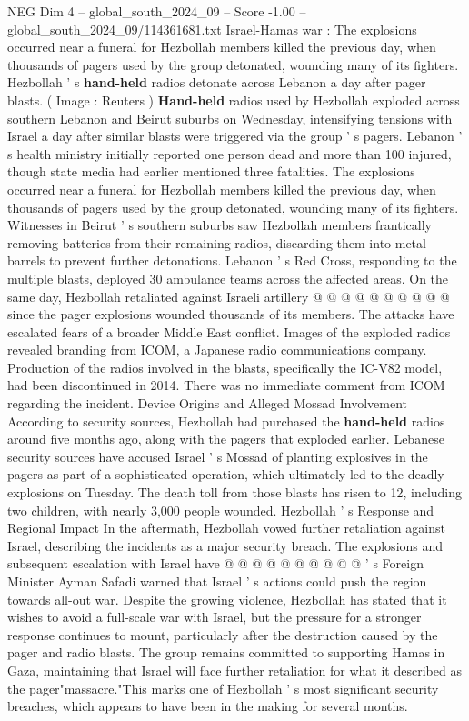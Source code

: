 \begin{textsample}{NEG Dim 4 – global\_south\_2024\_09 – Score -1.00 – global\_south\_2024\_09/114361681.txt}  \label{ex:f4_neg_183}
Israel-Hamas war : The explosions occurred near a funeral for Hezbollah members killed the previous day, when thousands of pagers used by the group detonated, wounding many of its fighters.
Hezbollah ' s \textbf{hand-held} radios detonate across Lebanon a day after pager blasts. ( Image : Reuters ) \textbf{Hand-held} radios used by Hezbollah exploded across southern Lebanon and Beirut suburbs on Wednesday, intensifying tensions with Israel a day after similar blasts were triggered via the group ' s pagers.
Lebanon ' s health ministry initially reported one person dead and more than 100 injured, though state media had earlier mentioned three fatalities.
The explosions occurred near a funeral for Hezbollah members killed the previous day, when thousands of pagers used by the group detonated, wounding many of its fighters.
Witnesses in Beirut ' s southern suburbs saw Hezbollah members frantically removing batteries from their remaining radios, discarding them into metal barrels to prevent further detonations.
Lebanon ' s Red Cross, responding to the multiple blasts, deployed 30 ambulance teams across the affected areas.
On the same day, Hezbollah retaliated against Israeli artillery @ @ @ @ @ @ @ @ @ @ since the pager explosions wounded thousands of its members.
The attacks have escalated fears of a broader Middle East conflict.
Images of the exploded radios revealed branding from ICOM, a Japanese radio communications company.
Production of the radios involved in the blasts, specifically the IC-V82 model, had been discontinued in 2014.
There was no immediate comment from ICOM regarding the incident.
Device Origins and Alleged Mossad Involvement According to security sources, Hezbollah had purchased the \textbf{hand-held} radios around five months ago, along with the pagers that exploded earlier.
Lebanese security sources have accused Israel ' s Mossad of planting explosives in the pagers as part of a sophisticated operation, which ultimately led to the deadly explosions on Tuesday.
The death toll from those blasts has risen to 12, including two children, with nearly 3,000 people wounded.
Hezbollah ' s Response and Regional Impact In the aftermath, Hezbollah vowed further retaliation against Israel, describing the incidents as a major security breach.
The explosions and subsequent escalation with Israel have @ @ @ @ @ @ @ @ @ @ ' s Foreign Minister Ayman Safadi warned that Israel ' s actions could push the region towards all-out war.
Despite the growing violence, Hezbollah has stated that it wishes to avoid a full-scale war with Israel, but the pressure for a stronger response continues to mount, particularly after the destruction caused by the pager and radio blasts.
The group remains committed to supporting Hamas in Gaza, maintaining that Israel will face further retaliation for what it described as the pager"massacre."This marks one of Hezbollah ' s most significant security breaches, which appears to have been in the making for several months.

\end{textsample}
